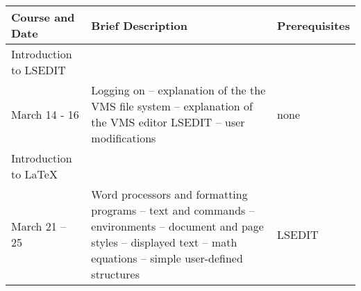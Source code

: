 \documentclass{article}
\begin{document}
	\begin{tabular}{p{3.5cm}p{3.5cm}l}
		Course and Date & Brief Description & Prerequisites \\
		\hline
		\raggedright 
		Introduction to LSEDIT \\
		March 14 - 16 & 
		Logging on -- explanation of the the VMS file system --
		explanation of the VMS editor LSEDIT -- user modifications &
		none \\
		\raggedright
		Introduction to LaTeX \\ March 21 -- 25 &
		Word processors and formatting programs --
		text and commands -- environments -- document and page
		styles -- displayed text -- math equations -- simple user-defined structures &
		LSEDIT
	\end{tabular}
\end{document}
